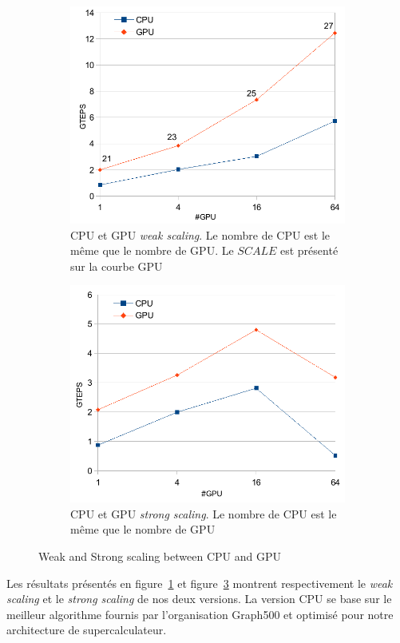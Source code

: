 \documentclass[12pt,a4paper]{report}
\begin{document}
\begin{figure}[ht!]
\begin{subfigure}[t]{0.48\linewidth}
\centering
\includegraphics[width=1\linewidth]{../figures/graph500/weak_scaling}
\caption[]{CPU et GPU \textit{weak scaling}. Le nombre de CPU est le même que le nombre de GPU. Le $SCALE$ est présenté sur la courbe GPU }
\label{fig:bfs_weak_scaling}
\end{subfigure}
\hfill
\begin{subfigure}[t]{0.48\linewidth}
\centering
\includegraphics[width=1\linewidth]{../figures/graph500/strong_scaling}
\caption[]{CPU et GPU \textit{strong scaling}. Le nombre de CPU est le même que le nombre de GPU}
\label{fig:bfs_strong_scaling}
\end{subfigure}
\caption{Weak and Strong scaling between CPU and GPU}
\end{figure}
Les résultats présentés en figure~\ref{fig:bfs_weak_scaling} et figure~\ref{fig:bfs_strong_scaling} montrent respectivement le \textit{weak scaling} et le \textit{strong scaling} de nos deux versions. 
La version CPU se base sur le meilleur algorithme fournis par l'organisation Graph500 et optimisé pour notre architecture de supercalculateur. 
\end{document}
